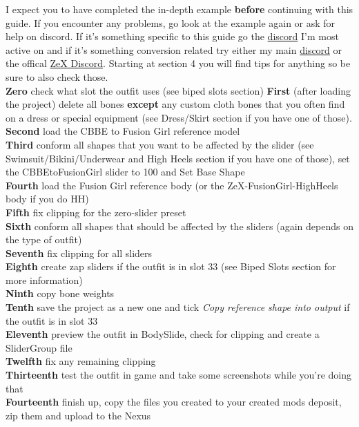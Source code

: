 I expect you to have completed the in-depth example \textbf{before} continuing with this guide. 
If you encounter any problems, go look at the example again or ask for help on discord. If it's something specific to this guide 
go the \href{https://discord.gg/JakcQPN}{discord} I'm most active on and if it's something conversion related try either my main 
\href{https://discord.gg/JakcQPN}{discord} or the offical \href{https://discord.gg/PNqYQpG}{ZeX Discord}. 
Starting at section 4 you will find tips for anything so be sure to also check those.\\
\textbf{Zero} check what slot the outfit uses (see biped slots section)
\textbf{First} (after loading the project) delete all bones \textbf{except} any custom cloth bones that you often find on a 
dress or special equipment (see Dress/Skirt section if you have one of those).\\
\textbf{Second} load the CBBE to Fusion Girl reference model\\
\textbf{Third} conform all shapes that you want to be affected by the slider (see Swimsuit/Bikini/Underwear and High Heels section if you have one of those),
set the CBBEtoFusionGirl slider to 100 and Set Base Shape\\
\textbf{Fourth} load the Fusion Girl reference body (or the ZeX-FusionGirl-HighHeels body if you do HH)\\
\textbf{Fifth} fix clipping for the zero-slider preset\\
\textbf{Sixth} conform all shapes that should be affected by the sliders (again depends on the type of outfit)\\
\textbf{Seventh} fix clipping for all sliders\\
\textbf{Eighth} create zap sliders if the outfit is in slot 33 (see Biped Slots section for more information)\\
\textbf{Ninth} copy bone weights\\
\textbf{Tenth} save the project as a new one and tick \textit{Copy reference shape into output} if the outfit is in slot 33\\
\textbf{Eleventh} preview the outfit in BodySlide, check for clipping and create a SliderGroup file\\
\textbf{Twelfth} fix any remaining clipping\\
\textbf{Thirteenth} test the outfit in game and take some screenshots while you're doing that\\
\textbf{Fourteenth} finish up, copy the files you created to your created mods deposit, zip them and upload to the Nexus\\
